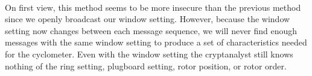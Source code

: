 

\text{}\\On first view, this method seems to be more insecure than the
previous method since we openly broadcast our window setting.
However, because the window setting now changes between each message
sequence, we will never find enough messages with the same window
setting to produce a set of characteristics needed for the
cyclometer. Even with the window setting the cryptanalyst still knows
nothing of the ring setting, plugboard setting, rotor position, or rotor order.

